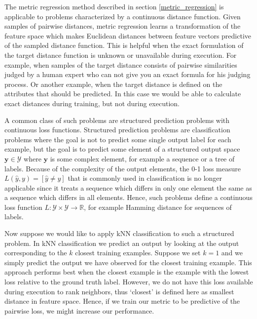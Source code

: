 \documentclass[a4paper,titlepage]{article}
\renewcommand{\vec}[1]{\mathbf{#1}}
\begin{document}

The metric regression method described in section \ref{metric_regression} is applicable to problems characterized by a continuous distance function. Given samples of pairwise distances, metric regression learns a transformation of the feature space which makes Euclidean distances between feature vectors predictive of the sampled distance function. This is helpful when the exact formulation of the target distance function is unknown or unavailable during execution. For example, when samples of the target distance consists of pairwise similarities judged by a human expert who can not give you an exact formula for his judging process. Or another example, when the target distance is defined on the attributes that should be predicted. In this case we would be able to calculate exact distances during training, but not during execution.

A common class of such problems are structured prediction problems with continuous loss functions. Structured prediction problems are classification problems where the goal is not to predict some single output label for each example, but the goal is to predict some element of a structured output space $\vec{y} \in \mathcal{Y}$ where $\vec{y}$ is some complex element, for example a sequence or a tree of labels. Because of the complexity of the output elements, the 0-1 loss measure $L(\hat{y}, y) = \left[\hat{y} \ne y\right]$ that is commonly used in classification is no longer applicable since it treats a sequence which differs in only one element the same as a sequence which differs in all elements. Hence, such problems define a continuous loss function $L: \mathcal{Y} \times \mathcal{Y} \rightarrow \mathbb{R}$, for example Hamming distance for sequences of labels.

Now suppose we would like to apply \acf{kNN} classification to such a structured problem. In \ac{kNN} classification we predict an output by looking at the output corresponding to the $k$ closest training examples. Suppose we set $k = 1$ and we simply predict the output we have observed for the closest training example. This approach performs best when the closest example is the example with the lowest loss relative to the ground truth label. However, we do not have this loss available during execution to rank neighbors, thus `closest' is defined here as smallest distance in feature space. Hence, if we train our metric to be predictive of the pairwise loss, we might increase our performance.
\end{document}

